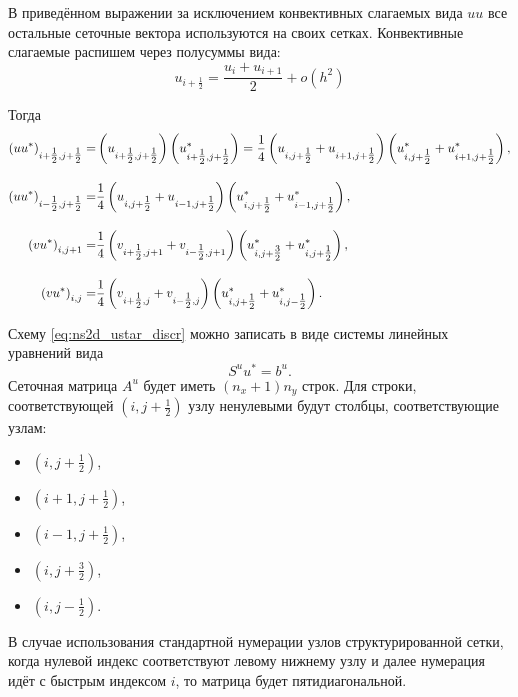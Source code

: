В приведённом выражении
за исключением конвективных слагаемых вида $u u$ все остальные
сеточные вектора используются на своих сетках.
Конвективные слагаемые распишем через полусуммы вида:
\begin{equation*}
    u_{i+\tfrac12} = \frac{u_{i} + u_{i+1}}{2} + o(h^2)
\end{equation*}

Тогда
\begin{align*}
    \left(u u^*\right)_{i+\tfrac12,j+\tfrac12} =&
        \left(u_{i+\tfrac12,j+\tfrac12} \vphantom{u^*_{\tfrac12}}\right)\left(u^*_{i+\tfrac12,j+\tfrac12}\right) =
        \frac14 \left(u_{i, j+\tfrac12} + u_{i+1,j+\tfrac12}\vphantom{u^*_{\tfrac12}}\right)
                \left(u^*_{i, j+\tfrac12} + u^*_{i+1,j+\tfrac12}\right), \\[10pt]
    \left(u u^*\right)_{i-\tfrac12,j+\tfrac12} =&
        \frac14 \left(u_{i, j+\tfrac12} + u_{i-1,j+\tfrac12}\vphantom{u^*_{\tfrac12}}\right)
                \left(u^*_{i, j+\tfrac12} + u^*_{i-1,j+\tfrac12}\right), \\[10pt]
    \left(v u^*\right)_{i,j+1} =&
        \frac14 \left(v_{i+\tfrac12, j+1} + v_{i-\tfrac12,j+1}\vphantom{u^*_{\tfrac12}}\right)
                \left(u^*_{i, j+\tfrac32} + u^*_{i,j+\tfrac12}\right), \\[10pt]
    \left(v u^*\right)_{i,j} =&
        \frac14 \left(v_{i+\tfrac12, j} + v_{i-\tfrac12,j}\vphantom{u^*_{\tfrac12}}\right)
                \left(u^*_{i, j+\tfrac12} + u^*_{i,j-\tfrac12}\right).
\end{align*}

Схему \eqref{eq:ns2d_ustar_discr} можно записать в виде системы линейных уравнений вида
\begin{equation}
    \label{eq:ns2d_ustar_slae}
    S^u u^* = b^{u}.
\end{equation}
Сеточная матрица $A^u$ будет иметь $(n_x+1)n_y$ строк.
Для строки, соответствующей $\left(i,j+\tfrac12\right)$ узлу ненулевыми будут столбцы,
соответствующие узлам:
\begin{itemize}
\item $\left(i,j+\tfrac12\right)$,
\item $\left(i+1,j+\tfrac12\right)$,
\item $\left(i-1,j+\tfrac12\right)$,
\item $\left(i,j+\tfrac32\right)$,
\item $\left(i,j-\tfrac12\right)$.
\end{itemize}

В случае использования стандартной нумерации узлов структурированной сетки,
когда нулевой индекс соответствуют левому нижнему узлу и далее нумерация идёт
с быстрым индексом $i$, то матрица будет пятидиагональной.


